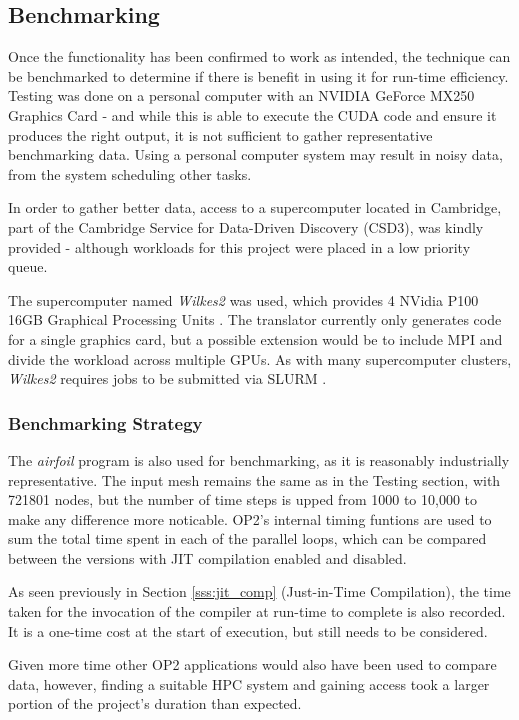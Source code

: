 \subsection{Benchmarking}
Once the functionality has been confirmed to work as intended, the technique can be benchmarked to determine if there is benefit in using it for run-time efficiency. Testing was done on a personal computer with an NVIDIA GeForce MX250 Graphics Card \cite{mx250} - and while this is able to execute the CUDA code and ensure it produces the right output, it is not sufficient to gather representative benchmarking data. Using a personal computer system may result in noisy data, from the system scheduling other tasks.
\par
In order to gather better data, access to a supercomputer located in Cambridge, part of the Cambridge Service for Data-Driven Discovery (CSD3), was kindly provided - although workloads for this project were placed in a low priority queue.
\par
The supercomputer named \textit{Wilkes2} was used, which provides 4 NVidia P100 16GB Graphical Processing Units \cite{p100}. The translator currently only generates code for a single graphics card, but a possible extension would be to include MPI and divide the workload across multiple GPUs. As with many supercomputer clusters, \textit{Wilkes2} requires jobs to be submitted via SLURM \cite{slurm}.

\subsubsection{Benchmarking Strategy}
The \textit{airfoil} program is also used for benchmarking, as it is reasonably industrially representative. The input mesh remains the same as in the Testing section, with 721801 nodes, but the number of time steps is upped from 1000 to 10,000 to make any difference more noticable. OP2's internal timing funtions are used to sum the total time spent in each of the parallel loops, which can be compared between the versions with JIT compilation enabled and disabled.
\par
As seen previously in Section \ref{sss:jit_comp} (Just-in-Time Compilation), the time taken for the invocation of the compiler at run-time to complete is also recorded. It is a one-time cost at the start of execution, but still needs to be considered.
\par
Given more time other OP2 applications would also have been used to compare data, however, finding a suitable HPC system and gaining access took a larger portion of the project's duration than expected.

